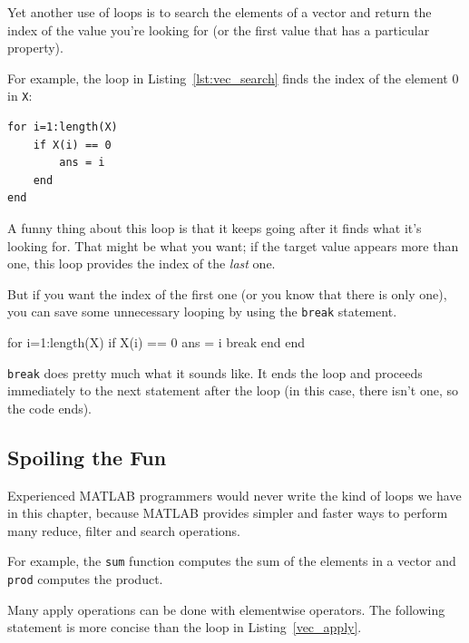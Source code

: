 Yet another use of loops is to search the elements of a vector
and return the index of the value you're looking for (or the
first value that has a particular property).  


For example, the loop in Listing~\ref{lst:vec_search} finds the index of the element 0 in 
{\tt X}:

\begin{lstlisting}[caption={Searching for the last appearance of 0 in a vector)}, label={lst:vec_search}]
for i=1:length(X)
    if X(i) == 0
        ans = i
    end
end
\end{lstlisting}

A funny thing about this loop is that it keeps going after it
finds what it's looking for.  That might be what you want; if the
target value appears more than one, this loop provides the index
of the {\em last} one.


But if you want the index of the first one (or you know that there
is only one), you can save some unnecessary looping by using the
{\tt break} statement.

\begin{code}
for i=1:length(X)
    if X(i) == 0
        ans = i
        break
    end
end
\end{code}

{\tt break} does pretty much what it sounds like.  It ends the
loop and proceeds immediately to the next statement after the
loop (in this case, there isn't one, so the code ends).


\subsection{Spoiling the Fun}

Experienced MATLAB programmers would never write the kind of loops
we have in this chapter, because MATLAB provides simpler and faster ways to
perform many reduce, filter and search operations.


For example, the {\tt sum} function computes the sum of the elements
in a vector and {\tt prod} computes the product.

Many apply operations can be done with elementwise operators.
The following statement is more concise than the loop in
Listing~\ref{vec_apply}.

